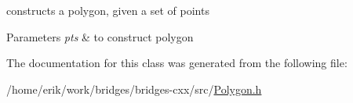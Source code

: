 constructs a polygon, given a set of points 


\begin{DoxyParams}{Parameters}
{\em pts} & to construct polygon \\
\hline
\end{DoxyParams}


The documentation for this class was generated from the following file\+:\begin{DoxyCompactItemize}
\item 
/home/erik/work/bridges/bridges-\/cxx/src/\hyperlink{_polygon_8h}{Polygon.\+h}\end{DoxyCompactItemize}
